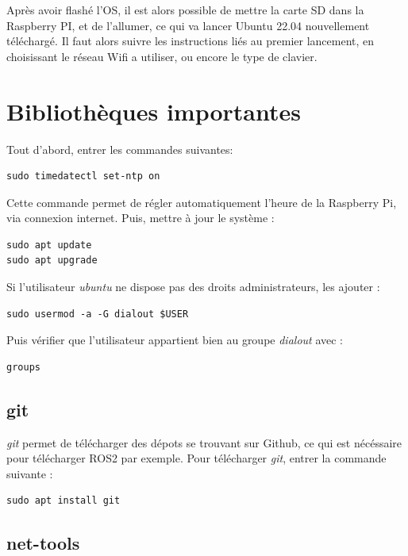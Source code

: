 Après avoir flashé l'OS, il est alors possible de mettre la carte SD dans la Raspberry PI, et de l'allumer, ce qui va lancer Ubuntu 22.04 nouvellement téléchargé. Il faut alors suivre les instructions liés au premier lancement, en choisissant le réseau Wifi a utiliser, ou encore le type de clavier.

\section{Bibliothèques importantes}

Tout d'abord, entrer les commandes suivantes:

\begin{lstlisting}[style=commandstyle]
sudo timedatectl set-ntp on
\end{lstlisting}
\noindent Cette commande permet de régler automatiquement l'heure de la Raspberry Pi, via connexion internet. Puis, mettre à jour le système :

\begin{lstlisting}[style=commandstyle]
sudo apt update
sudo apt upgrade
\end{lstlisting}

\noindent Si l'utilisateur \textit{ubuntu} ne dispose pas des droits administrateurs, les ajouter :

\begin{lstlisting}[style=commandstyle]
sudo usermod -a -G dialout $USER
\end{lstlisting}

\noindent Puis vérifier que l'utilisateur appartient bien au groupe \textit{dialout} avec :

\begin{lstlisting}[style=commandstyle]
groups
\end{lstlisting}

\subsection{git}

\textit{git} permet de télécharger des dépots se trouvant sur Github, ce qui est nécéssaire pour télécharger ROS2 par exemple.
Pour télécharger \textit{git}, entrer la commande suivante :

\begin{lstlisting}[style=commandstyle]
sudo apt install git
\end{lstlisting}

\subsection{net-tools}

